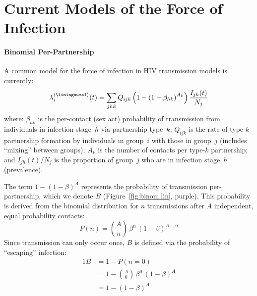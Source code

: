 \section{Current Models of the Force of Infection}
\paragraph{ Binomial Per-Partnership}
A common model for the force of infection in HIV transmission models is currently:
\begin{equation}\label{eq:foi.1}
  \lambda_i^{\case{1}}(t) =
  \sum_{jhk} Q_{ijk} \left(1 - {\left(1 - \beta_{hk}\right)}^{A_k}\right) \frac{I_{jh}(t)}{N_j}
\end{equation}
where:
$\beta_{hk}$ is the per-contact (sex act) probability of transmission
from individuals in infection stage~$h$ via partnership type~$k$;
$Q_{ijk}$ is the rate of type-$k$ partnership formation
by individuals in group~$i$ with those in group~$j$
(includes ``mixing'' between groups);
$A_k$ is the number of contacts per type-$k$ partnership; and
$I_{jh}(t) / N_j$ is the proportion of group~$j$ who are in infection stage~$h$ (prevalence).
\par
The term $1 - (1 - \beta)^A$ represents
the probability of transmission per-partnership, which we denote $B$
(Figure~\ref{fig:binom.lin}, purple).
This probability is derived from the binomial distribution
for $n$ transmissions after $A$ independent, equal probability contacts:
\begin{equation}
  P(n) = {A \choose n}\,\beta^n\,{(1 - \beta)}^{A-n}
\end{equation}
Since transmission can only occur once, $B$ is defined via the probability of ``escaping'' infection:
\begin{alignat}{1}\label{eq:B}
  B &= 1 - P(n = 0) \nonumber\\
  &= 1 - {A \choose 0}\,\beta^0\,{(1 - \beta)}^{A} \nonumber\\
  &= 1 - {(1 - \beta)}^A
\end{alignat}
